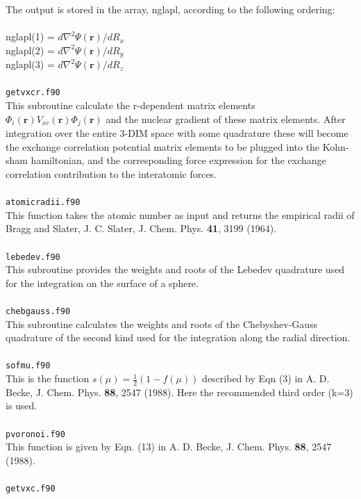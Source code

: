 \documentclass[a4paper,twoside,openany]{book}
\begin{document}
{{The output is stored in the array, nglapl, according to the
following ordering:\\ \\
nglapl(1) = $d\nabla^{2}\Psi(\mathbf{r})/dR_{x}$ \\
nglapl(2) = $d\nabla^{2}\Psi(\mathbf{r})/dR_{y}$ \\
nglapl(3) = $d\nabla^{2}\Psi(\mathbf{r})/dR_{z}$ \\ \\
\texttt{getvxcr.f90}\\
This subroutine calculate the r-dependent matrix elements     
$\Phi_{i}(\mathbf{r})V_{xc}(\mathbf{r})\Phi_{j}(\mathbf{r})$ and the nuclear gradient         
of these matrix elements. After integration over the   
entire 3-DIM space with some quadrature these will become     
the exchange correlation potential matrix elements  to be      
plugged into the Kohn-sham hamiltonian, and the corresponding 
force expression for the exchange correlation contribution    
to the interatomic forces.     \\ \\   
\texttt{atomicradii.f90}\\
This function takes the atomic number as input 
and returns the empirical radii of Bragg and Slater,
J. C. Slater, J. Chem. Phys. {\bf 41}, 3199 (1964). \\ \\
\texttt{lebedev.f90}\\
This subroutine provides the weights and roots of  the Lebedev quadrature used for the integration on the surface of a sphere. \\ \\
\texttt{chebgauss.f90}\\
This subroutine calculates the weights and roots of the Chebyshev-Gauss quadrature of the second kind used for the integration along the radial direction.  \\ \\
\texttt{sofmu.f90}\\
This is the function $s(\mu) = \frac{1}{2}(1 - f(\mu) )$
described by Eqn (3) 
in A. D. Becke, J. Chem. Phys. {\bf 88}, 2547 (1988).
Here the recommended third order (k=3) is used.   \\ \\
\texttt{pvoronoi.f90}\\
This function is given by Eqn. (13)
in A. D. Becke, J. Chem. Phys. {\bf 88}, 2547 (1988). \\ \\
\texttt{getvxc.f90} \\
}}
\end{document}
